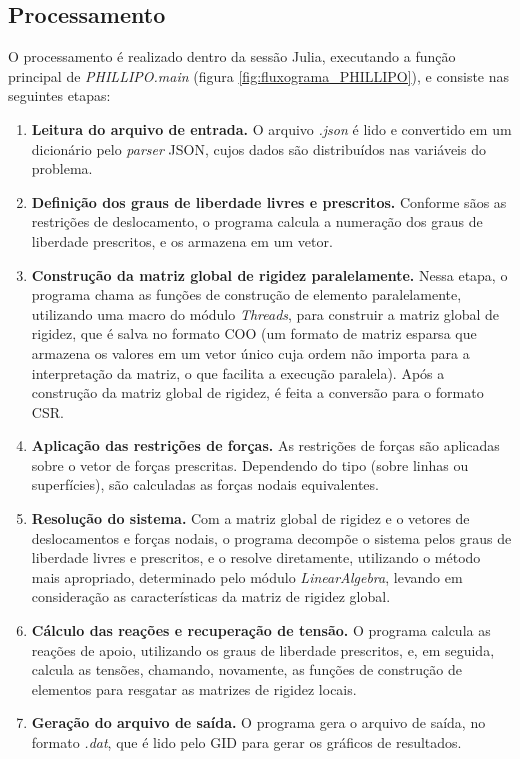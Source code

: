 \subsection{Processamento}

O processamento é realizado dentro da sessão Julia, executando a função principal de \emph{PHILLIPO.main} (figura \ref{fig:fluxograma_PHILLIPO}), e consiste nas seguintes etapas:
\begin{enumerate}
    \item \textbf{Leitura do arquivo de entrada.} O arquivo \emph{.json} é lido e convertido em um dicionário pelo \emph{parser} JSON, cujos dados são distribuídos nas variáveis do problema.
    \item \textbf{Definição dos graus de liberdade livres e prescritos.} Conforme sãos as restrições de deslocamento, o programa calcula a numeração dos graus de liberdade prescritos, e os armazena em um vetor.
    \item \textbf{Construção da matriz global de rigidez paralelamente.} Nessa etapa, o programa chama as funções de construção de elemento paralelamente, utilizando uma macro do módulo \emph{Threads}, para construir a matriz global de rigidez, que é salva no formato COO (um formato de matriz esparsa que armazena os valores em um vetor único cuja ordem não importa para a interpretação da matriz, o que facilita a execução paralela). Após a construção da matriz global de rigidez, é feita a conversão para o formato CSR. 
    \item \textbf{Aplicação das restrições de forças.} As restrições de forças são aplicadas sobre o vetor de forças prescritas. Dependendo do tipo (sobre linhas ou superfícies), são calculadas as forças nodais equivalentes.
    \item \textbf{Resolução do sistema.} Com a matriz global de rigidez e o vetores de deslocamentos e forças nodais, o programa decompõe o sistema pelos graus de liberdade livres e prescritos, e o resolve diretamente, utilizando o método mais apropriado, determinado pelo módulo \emph{LinearAlgebra}, levando em consideração as características da matriz de rigidez global.
    \item \textbf{Cálculo das reações e recuperação de tensão.} O programa calcula as reações de apoio, utilizando os graus de liberdade prescritos, e, em seguida, calcula as tensões, chamando, novamente, as funções de construção de elementos para resgatar as matrizes de rigidez locais.
    \item \textbf{Geração do arquivo de saída.} O programa gera o arquivo de saída, no formato \emph{.dat}, que é lido pelo GID para gerar os gráficos de resultados.

\end{enumerate}

